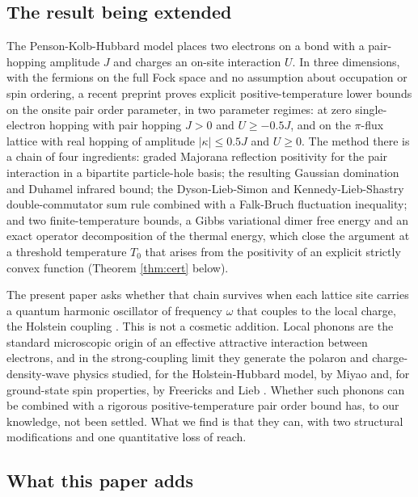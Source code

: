\documentclass[11pt]{article}
\numberwithin{equation}{section}
\theoremstyle{definition}
\begin{document}
\subsection{The result being extended}

The Penson-Kolb-Hubbard model \cite{penson1986} places two electrons on a bond with a
pair-hopping amplitude $J$ and charges an on-site interaction $U$. In three
dimensions, with the fermions on the full Fock space and no assumption about
occupation or spin ordering, a recent preprint \cite{rens2026pkodlro} proves explicit
positive-temperature lower bounds on the onsite pair order parameter, in two
parameter regimes: at zero single-electron hopping with pair hopping $J>0$ and
$U\ge-0.5J$, and on the $\pi$-flux lattice with real hopping of amplitude
$|\kappa|\le0.5J$ and $U\ge0$. The method there is a chain of four ingredients:
graded Majorana reflection positivity for the pair interaction in a bipartite
particle-hole basis; the resulting Gaussian domination and Duhamel infrared bound;
the Dyson-Lieb-Simon \cite{dyson1978} and Kennedy-Lieb-Shastry \cite{kennedy1988}
double-commutator sum rule combined with a Falk-Bruch \cite{falk1969} fluctuation
inequality; and two finite-temperature bounds, a Gibbs variational dimer free energy
and an exact operator decomposition of the thermal energy, which close the argument at
a threshold temperature $T_0$ that arises from the positivity of an explicit
strictly convex function (Theorem \ref{thm:cert} below).

The present paper asks whether that chain survives when each lattice site carries a
quantum harmonic oscillator of frequency $\omega$ that couples to the local charge, the
Holstein coupling \cite{holstein1959}. This is not a cosmetic addition. Local phonons
are the standard microscopic origin of an effective attractive interaction between
electrons, and in the strong-coupling limit they generate the polaron and
charge-density-wave physics studied, for the Holstein-Hubbard model, by Miyao
\cite{miyao2016} and, for ground-state spin properties, by Freericks and Lieb
\cite{freericks1995}. Whether such phonons can be combined with a rigorous
positive-temperature pair order bound has, to our knowledge, not been settled. What we
find is that they can, with two structural modifications and one quantitative loss of
reach.

\subsection{What this paper adds}
\end{document}
